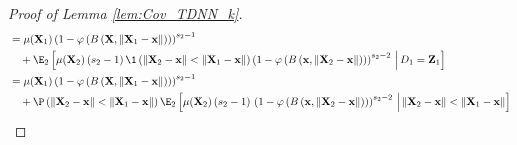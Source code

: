 \begin{proof}[Proof of Lemma \ref{lem:Cov_TDNN_k}]
\begin{equation}
\begin{aligned}
			 & = \mu(\mathbf{X}_1) \left(1 - \varphi\left(B\left(\mathbf{X}, \| \mathbf{X}_1 - \mathbf{x} \|\right)\right)\right)^{s_2 - 1} \\
			 & \quad + \E_{2}\left[
				\mu(\mathbf{X}_2)\, (s_2 - 1) \,
				\1\left(\|\mathbf{X}_2 - \mathbf{x}\| < \|\mathbf{X}_1 - \mathbf{x}\|\right)
				\left(1 - \varphi\left(B\left(\mathbf{x}, \| \mathbf{X}_2 - \mathbf{x} \|\right)\right)\right)^{s_2 - 2}
			\, \Big| \, D_1 = \mathbf{Z}_1\right]                                                                                           \\
			 & = \mu(\mathbf{X}_1) \left(1 - \varphi\left(B\left(\mathbf{X}, \| \mathbf{X}_1 - \mathbf{x} \|\right)\right)\right)^{s_2 - 1} \\
			 & \quad + \P\left(\|\mathbf{X}_2 - \mathbf{x}\| < \|\mathbf{X}_1 - \mathbf{x}\|\right)\E_{2}\left[
				\mu(\mathbf{X}_2)\, (s_2 - 1) \,
				\left(1 - \varphi\left(B\left(\mathbf{x}, \| \mathbf{X}_2 - \mathbf{x} \|\right)\right)\right)^{s_2 - 2}
				\, \Big| \, \|\mathbf{X}_2 - \mathbf{x}\| < \|\mathbf{X}_1 - \mathbf{x}\|\right]
		\end{aligned}
	\end{equation}


\end{proof}
